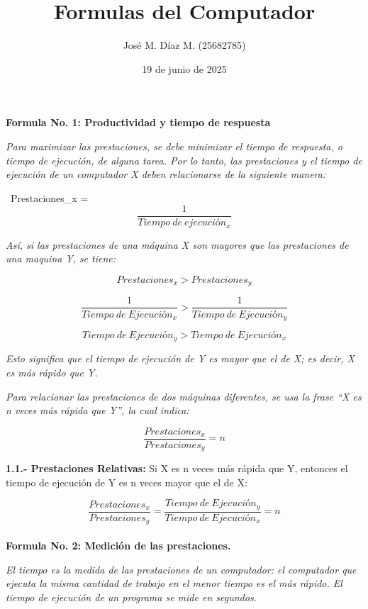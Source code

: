 \documentclass{article}
\title{Formulas del Computador}
\author{José M. Díaz M. (25682785)}
\date{19 de junio de 2025}
\begin{document}
\maketitle

\textbf{Formula No. 1: Productividad y tiempo de respuesta}

\quad

\textit{Para maximizar las prestaciones, se debe minimizar el tiempo de respuesta, o tiempo de ejecución, de alguna tarea. Por lo tanto, las prestaciones y el tiempo de ejecución de un computador X deben relacionarse de la siguiente manera:}

\quad

\ Prestaciones_x = \[ \frac{1}{Tiempo\ de\ ejecución_x}\]

\quad

\textit{Así, si las prestaciones de una máquina X son mayores que las prestaciones de una maquina Y,}
\textit{se tiene:}

\[{Prestaciones_x} > {Prestaciones_y}\]

\[\frac{1}{Tiempo\ de\ Ejecución_x} > \frac{1}{Tiempo\ de\ Ejecución_y}\]

\[{Tiempo\ de\ Ejecución_y} > {Tiempo\ de\ Ejecución_x}\]

\quad

\textit{Esto significa que el tiempo de ejecución de Y es mayor que el de X; es decir, X es más rápido que Y.}

\quad

\textit{Para relacionar las prestaciones de dos máquinas diferentes, se usa la frase “X es n veces más rápida que Y”, la cual indica:}

\[\frac{Prestaciones_x}{Prestaciones_y} = n\]

\quad

\textbf{1.1.- Prestaciones Relativas:} {Si X es n veces más rápida que Y, entonces el tiempo de ejecución de Y es n veces mayor que el de X:}

\quad

\[\frac{Prestaciones_x}{Prestaciones_y} = \frac{Tiempo\ de\ Ejecución_y}{Tiempo\ de\ Ejecución_x} = n\] \\


\textbf{Formula No. 2: Medición de las prestaciones.}

\quad

\textit{El tiempo es la medida de las prestaciones de un computador: el computador que ejecuta la misma cantidad de trabajo en el menor tiempo es el más rápido. El tiempo de ejecución de un programa se mide en segundos.}
\end{document}
